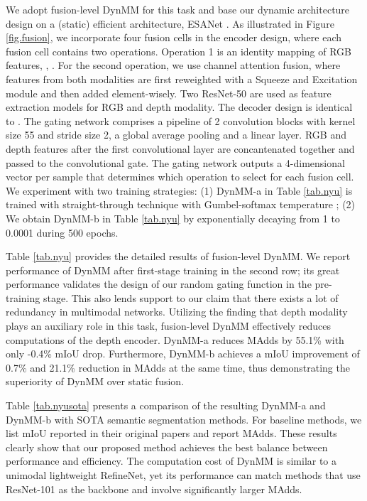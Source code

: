 We adopt fusion-level DynMM for this task and base our dynamic architecture design on a (static) efficient architecture, ESANet \cite{esanet}. As illustrated in Figure \ref{fig.fusion}, we incorporate four fusion cells in the encoder design, where each fusion cell contains two operations. Operation 1 is an identity mapping of RGB features, \ie, . For the second operation, we use channel attention fusion, where features from both modalities are first reweighted with a Squeeze and Excitation module \cite{hu2018squeeze} and then added element-wisely. Two ResNet-50 \cite{resnet} are used as feature extraction models for RGB and depth modality. The decoder design is identical to \cite{esanet}. The gating network comprises a pipeline of 2 convolution blocks with kernel size 55 and stride size 2, a global average pooling and a linear layer. RGB and depth features after the first convolutional layer are concantenated together and passed to the convolutional gate. The gating network outputs a 4-dimensional vector per sample that determines which operation to select for each fusion cell. We experiment with two training strategies: (1) DynMM-a in Table \ref{tab.nyu} is trained with straight-through technique with Gumbel-softmax temperature ; (2) We obtain DynMM-b in Table \ref{tab.nyu} by exponentially decaying  from 1 to 0.0001 during 500 epochs.

Table \ref{tab.nyu} provides the detailed results of fusion-level DynMM. We report performance of DynMM after first-stage training in the second row; its great performance validates the design of our random gating function in the pre-training stage. This also lends support to our claim that there exists a lot of redundancy in multimodal networks. Utilizing the finding that depth modality plays an auxiliary role in this task, fusion-level DynMM effectively reduces computations of the depth encoder. DynMM-a reduces MAdds by 55.1\% with only -0.4\% mIoU drop. Furthermore, DynMM-b achieves a mIoU improvement of 0.7\% and 21.1\% reduction in MAdds at the same time, thus demonstrating the superiority of DynMM over static fusion. 


Table \ref{tab.nyusota} presents a comparison of the resulting DynMM-a and DynMM-b with SOTA semantic segmentation methods. For baseline methods, we list mIoU reported in their original papers and report MAdds. These results clearly show that our proposed method achieves the best balance between performance and efficiency. The computation cost of DynMM is similar to a unimodal lightweight RefineNet, yet its performance can match methods that use ResNet-101 as the backbone and involve significantly larger MAdds. 




